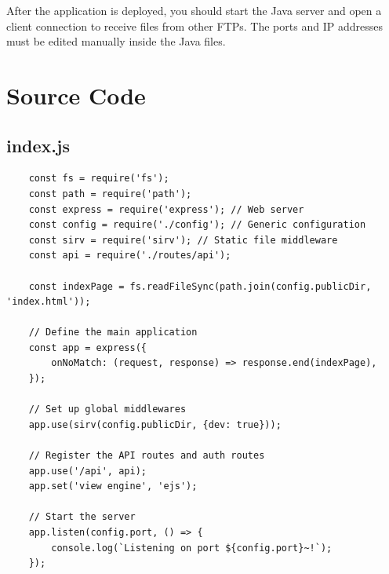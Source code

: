 \documentclass[12pt]{article}
\begin{document}
After the application is deployed, you should start the Java server and open a client connection to receive files 
from other FTPs. The ports and IP addresses must be edited manually inside the Java files.

\section{Source Code}

\subsection{index.js}
\begin{verbatim}
	const fs = require('fs');
	const path = require('path');
	const express = require('express'); // Web server
	const config = require('./config'); // Generic configuration
	const sirv = require('sirv'); // Static file middleware
	const api = require('./routes/api');
	
	const indexPage = fs.readFileSync(path.join(config.publicDir, 'index.html'));
	
	// Define the main application
	const app = express({
		onNoMatch: (request, response) => response.end(indexPage),
	});
	
	// Set up global middlewares
	app.use(sirv(config.publicDir, {dev: true}));
	
	// Register the API routes and auth routes
	app.use('/api', api);
	app.set('view engine', 'ejs');
	
	// Start the server
	app.listen(config.port, () => {
		console.log(`Listening on port ${config.port}~!`);
	});
\end{verbatim}
\end{document}
